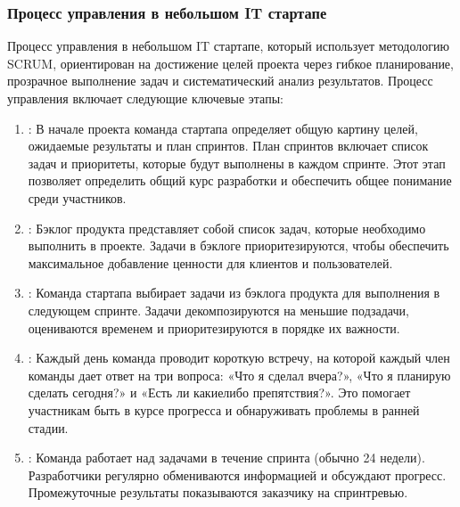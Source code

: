 \documentclass[letterpaper,10pt,russian]{sphinxmanual}
\begin{document}
\subsubsection{Процесс управления в небольшом IT стартапе}
\label{\detokenize{educational_materials/team_work_on_a_project/content:it}}
\sphinxAtStartPar
Процесс управления в небольшом IT стартапе, который использует методологию SCRUM, ориентирован на достижение целей проекта через гибкое планирование, прозрачное выполнение задач и систематический анализ результатов. Процесс управления включает следующие ключевые этапы:
\begin{enumerate}
%
\item {} 
\sphinxAtStartPar
{}:
В начале проекта команда стартапа определяет общую картину целей, ожидаемые результаты и план спринтов. План спринтов включает список задач и приоритеты, которые будут выполнены в каждом спринте. Этот этап позволяет определить общий курс разработки и обеспечить общее понимание среди участников.

\item {} 
\sphinxAtStartPar
{}:
Бэклог продукта представляет собой список задач, которые необходимо выполнить в проекте. Задачи в бэклоге приоритезируются, чтобы обеспечить максимальное добавление ценности для клиентов и пользователей.

\item {} 
\sphinxAtStartPar
{}:
Команда стартапа выбирает задачи из бэклога продукта для выполнения в следующем спринте. Задачи декомпозируются на меньшие подзадачи, оцениваются временем и приоритезируются в порядке их важности.

\item {} 
\sphinxAtStartPar
{}:
Каждый день команда проводит короткую встречу, на которой каждый член команды дает ответ на три вопроса: «Что я сделал вчера?», «Что я планирую сделать сегодня?» и «Есть ли какие\sphinxhyphen{}либо препятствия?». Это помогает участникам быть в курсе прогресса и обнаруживать проблемы в ранней стадии.

\item {} 
\sphinxAtStartPar
{}:
Команда работает над задачами в течение спринта (обычно 2\sphinxhyphen{}4 недели). Разработчики регулярно обмениваются информацией и обсуждают прогресс. Промежуточные результаты показываются заказчику на спринт\sphinxhyphen{}ревью.


\end{enumerate}
\end{document}
